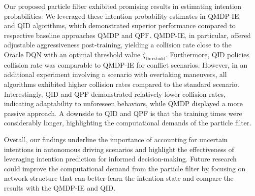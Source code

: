 Our proposed particle filter exhibited promising results in estimating intention probabilities.
We leveraged these intention probability estimates in QMDP-IE and QID algorithms, which demonstrated superior performance compared to respective baseline approaches QMDP and QPF. QMDP-IE, in particular, offered adjustable aggressiveness post-training, yielding a collision rate close to the Oracle DQN with an optimal threshold value $\zeta_\mathrm{threshold}$.
Furthermore, QID policies collision rate was comparable to QMDP-IE for conflict scenarios. 
However, in an additional experiment involving a scenario with overtaking maneuvers, all algorithms exhibited higher collision rates compared to the standard scenario. Interestingly, QID and QPF demonstrated relatively lower collision rates, indicating adaptability to unforeseen behaviors, while QMDP displayed a more passive approach.
A downside to QID and QPF is that the training times were considerably longer, highlighting the computational demands of the particle filter.

Overall, our findings underline the importance of accounting for uncertain intentions in autonomous driving scenarios and highlight the effectiveness of leveraging intention prediction for informed decision-making. 
Future research could improve the computational demand from the particle filter by focusing on network structure that can better learn the intention state and compare the results with the QMDP-IE and QID. 